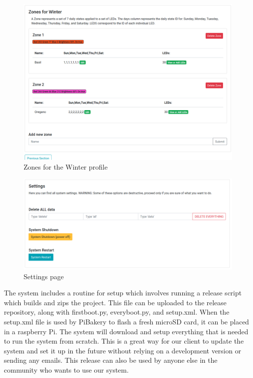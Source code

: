 \documentclass[onecolumn, draftclsnofoot,10pt, compsoc]{IEEEtran}
\begin{document}
	\begin{center}
		\begin{figure}[H]
			\includegraphics[width=\linewidth]{site/zones_winter.png}
			\caption{Zones for the Winter profile}
			\label{fig:siteZonesWinter}
		\end{figure}
	\end{center}
	\begin{center}
		\begin{figure}[H]
			\includegraphics[width=\linewidth]{site/settings.png}
			\caption{Settings page}
			\label{fig:siteSettings}
		\end{figure}
	\end{center}
	
	The system includes a routine for setup which involves running a release script which builds and zips the project.
	This file can be uploaded to the release repository, along with firstboot.py, everyboot.py, and setup.xml.
	When the setup.xml file is used by PiBakery to flash a fresh microSD card, it can be placed in a raspberry Pi.
	The system will download and setup everything that is needed to run the system from scratch.
	This is a great way for our client to update the system and set it up in the future without relying on a development version or sending any emails.
	This release can also be used by anyone else in the community who wants to use our system.
\end{document}
